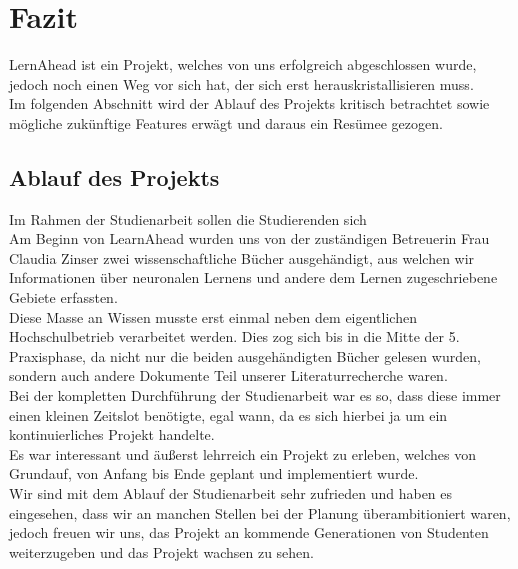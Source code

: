 \section{Fazit}
LernAhead ist ein Projekt, welches von uns erfolgreich abgeschlossen wurde, jedoch noch einen Weg vor sich hat, der sich erst herauskristallisieren muss.\\

\noindent
Im folgenden Abschnitt wird der Ablauf des Projekts kritisch betrachtet sowie mögliche zukünftige Features erwägt und daraus ein Resümee gezogen.

\subsection{Ablauf des Projekts}
Im Rahmen der Studienarbeit sollen die Studierenden sich \cite{DHBW_Studienarbeit}\\

\noindent
Am Beginn von LearnAhead wurden uns von der zuständigen Betreuerin Frau Claudia Zinser zwei wissenschaftliche Bücher ausgehändigt, aus welchen wir Informationen über neuronalen Lernens und andere dem Lernen zugeschriebene Gebiete erfassten.\\

\noindent
Diese Masse an Wissen musste erst einmal neben dem eigentlichen Hochschulbetrieb verarbeitet werden. Dies zog sich bis in die Mitte der 5. Praxisphase, da nicht nur die beiden ausgehändigten Bücher gelesen wurden, sondern auch andere Dokumente Teil unserer Literaturrecherche waren.\\

\noindent
Bei der kompletten Durchführung der Studienarbeit war es so, dass diese immer einen kleinen Zeitslot benötigte, egal wann, da es sich hierbei ja um ein kontinuierliches Projekt handelte.\\

\noindent
Es war interessant und äußerst lehrreich ein Projekt zu erleben, welches von Grundauf, von Anfang bis Ende geplant und implementiert wurde.\\

\noindent
Wir sind mit dem Ablauf der Studienarbeit sehr zufrieden und haben es eingesehen, dass wir an manchen Stellen bei der Planung überambitioniert waren, jedoch freuen wir uns, das Projekt an kommende Generationen von Studenten weiterzugeben und das Projekt wachsen zu sehen.\\

